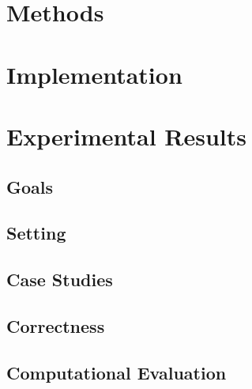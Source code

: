 \documentclass[12pt,a4paper]{article}
\begin{document}
\section{Methods}

\section{Implementation}

\section{Experimental Results}

\subsection{Goals}

\subsection{Setting}

\subsection{Case Studies}

\subsection{Correctness}

\subsection{Computational Evaluation}
\end{document}
